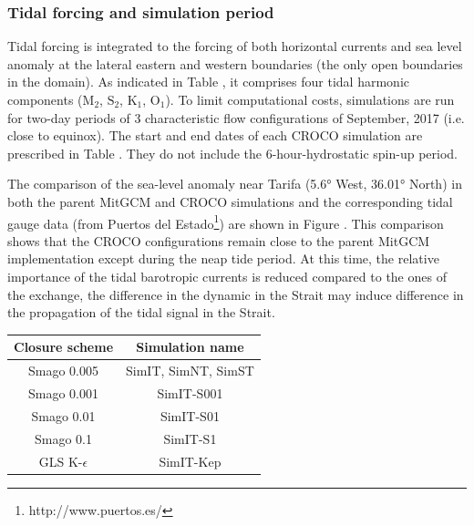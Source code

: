 \subsubsection{Tidal forcing and simulation period}
Tidal forcing is integrated to the forcing of both horizontal currents and sea level anomaly at the lateral eastern and western boundaries (the only open boundaries in the domain). As indicated in Table , it comprises four tidal harmonic components ($\text{M}_{\text{2}}$, $\text{S}_{\text{2}}$, $\text{K}_{\text{1}}$, $\text{O}_{\text{1}}$). To limit computational costs, simulations are run for two-day periods of 3 characteristic flow configurations of September, 2017 (i.e. close to equinox). The start and end dates of each CROCO simulation are prescribed in Table . They do not include the 6-hour-hydrostatic spin-up period.

The comparison of the sea-level anomaly near Tarifa (5.6° West, 36.01° North) in both the parent MitGCM and CROCO simulations and the corresponding tidal gauge data (from Puertos del Estado\footnote{http://www.puertos.es/}) are shown in Figure . This comparison shows that the CROCO configurations remain close to the parent MitGCM implementation except during the neap tide period. At this time, the relative importance of the tidal barotropic currents is reduced compared to the ones of the exchange, the difference in the dynamic in the Strait may induce difference in the propagation of the tidal signal in the Strait.

\begin{table}[!h]
        \centering
        \begin{tabular}{|c|c|}
                \hline
                Closure scheme & Simulation name\\
                \hline
                Smago 0.005 & SimIT, SimNT, SimST\\
                Smago 0.001 & SimIT-S001\\
                Smago 0.01 & SimIT-S01\\
                Smago 0.1 & SimIT-S1\\
                GLS K-$\epsilon$ & SimIT-Kep\\
                \hline
        \end{tabular}
        \label{tab_sim3Dnames}
\end{table}



